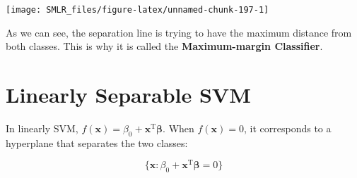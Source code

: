 \documentclass[
]{book}
\newenvironment{Shaded}{\begin{snugshade}}{\end{snugshade}}
\newcommand{\AttributeTok}[1]{\textcolor[rgb]{0.13,0.29,0.53}{#1}}
\newcommand{\CommentTok}[1]{\textcolor[rgb]{0.56,0.35,0.01}{\textit{#1}}}
\newcommand{\DecValTok}[1]{\textcolor[rgb]{0.00,0.00,0.81}{#1}}
\newcommand{\FunctionTok}[1]{\textcolor[rgb]{0.13,0.29,0.53}{\textbf{#1}}}
\newcommand{\NormalTok}[1]{#1}
\newcommand{\SpecialCharTok}[1]{\textcolor[rgb]{0.81,0.36,0.00}{\textbf{#1}}}
\newcommand{\StringTok}[1]{\textcolor[rgb]{0.31,0.60,0.02}{#1}}
\theoremstyle{definition}
\theoremstyle{definition}
\theoremstyle{definition}
\theoremstyle{definition}
\theoremstyle{remark}
\begin{document}
\begin{Shaded}
\end{Shaded}

\begin{center}\texttt{[image: SMLR\_files/figure-latex/unnamed-chunk-197-1]} \end{center}

As we can see, the separation line is trying to have the maximum distance from both classes. This is why it is called the \textbf{Maximum-margin Classifier}.

\hypertarget{linearly-separable-svm}{%
\section{Linearly Separable SVM}\label{linearly-separable-svm}}

In linearly SVM, \(f(\mathbf{x}) = \beta_0 + \mathbf{x}^\text{T}\boldsymbol \beta\). When \(f(\mathbf{x}) = 0\), it corresponds to a hyperplane that separates the two classes:

\[\{ \mathbf{x}: \beta_0 + \mathbf{x}^\text{T} \boldsymbol \beta = 0 \}\]
\end{document}
